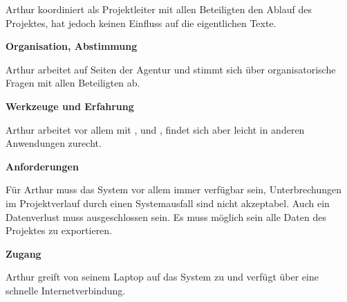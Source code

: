 \begin{multicols}{2}

\begin{center}
\end{center}


Arthur koordiniert als Projektleiter mit allen Beteiligten den Ablauf des Projektes, hat jedoch keinen Einfluss auf die eigentlichen Texte.

\textbf{Organisation, Abstimmung}

Arthur arbeitet auf Seiten der Agentur und stimmt sich über organisatorische Fragen mit allen Beteiligten ab.

\textbf{Werkzeuge und Erfahrung}

Arthur arbeitet vor allem mit ,  und , findet sich aber leicht in anderen Anwendungen zurecht.

\textbf{Anforderungen}

Für Arthur muss das System vor allem immer verfügbar sein, Unterbrechungen im Projektverlauf durch einen Systemausfall sind nicht akzeptabel. Auch ein Datenverlust muss ausgeschlossen sein. Es muss möglich sein alle Daten des Projektes zu exportieren.

\columnbreak

\textbf{Zugang}

Arthur greift von seinem Laptop auf das System zu und verfügt über eine schnelle Internetverbindung.


\end{multicols}
